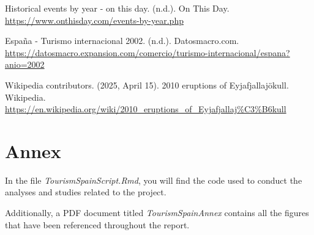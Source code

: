 \documentclass[
]{article}
\begin{document}
Historical events by year - on this day. (n.d.). On This Day.
\url{https://www.onthisday.com/events-by-year.php}

España - Turismo internacional 2002. (n.d.). Datosmacro.com.
\url{https://datosmacro.expansion.com/comercio/turismo-internacional/espana?anio=2002}

Wikipedia contributors. (2025, April 15). 2010 eruptions of
Eyjafjallajökull. Wikipedia.
\url{https://en.wikipedia.org/wiki/2010_eruptions_of_Eyjafjallaj\%C3\%B6kull}

\hypertarget{annex}{%
\section{Annex}\label{annex}}

In the file \emph{TourismSpainScript.Rmd}, you will find the code used
to conduct the analyses and studies related to the project.

Additionally, a PDF document titled \emph{TourismSpainAnnex} contains
all the figures that have been referenced throughout the report.
\end{document}
